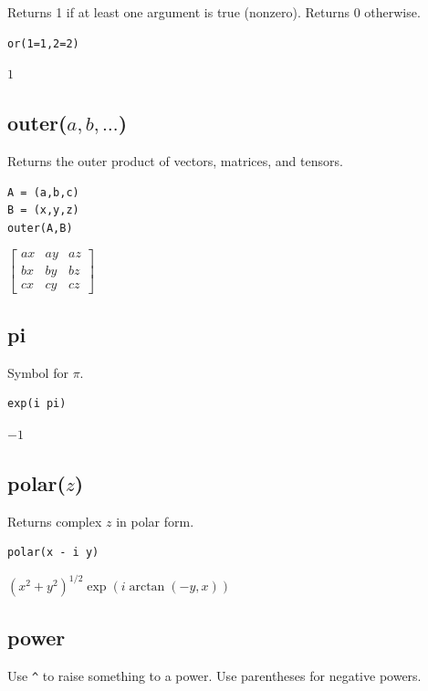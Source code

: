 \documentclass[12pt]{article}
\begin{document}
Returns 1 if at least one argument is true (nonzero).
Returns 0 otherwise.

{\color{blue}
\begin{verbatim}
or(1=1,2=2)
\end{verbatim}
}

\noindent
$1$

\subsection*{outer($a,b,\ldots$)}

Returns the outer product of vectors, matrices, and tensors.

{\color{blue}
\begin{verbatim}
A = (a,b,c)
B = (x,y,z)
outer(A,B)
\end{verbatim}
}

\noindent
$\displaystyle
\begin{bmatrix}
a x & a y & a z
\\[1ex]
b x & b y & b z
\\[1ex]
c x & c y & c z
\end{bmatrix}
$

\subsection*{pi}

Symbol for $\pi$.

{\color{blue}
\begin{verbatim}
exp(i pi)
\end{verbatim}
}

\noindent
$-1$

\subsection*{polar($z$)}

Returns complex $z$ in polar form.

{\color{blue}
\begin{verbatim}
polar(x - i y)
\end{verbatim}
}

\noindent
$\displaystyle (x^2+y^2)^{1/2}\exp(i\arctan(-y,x))$

\subsection*{power}

Use \verb$^$ to raise something to a power.
Use parentheses for negative powers.
\end{document}
